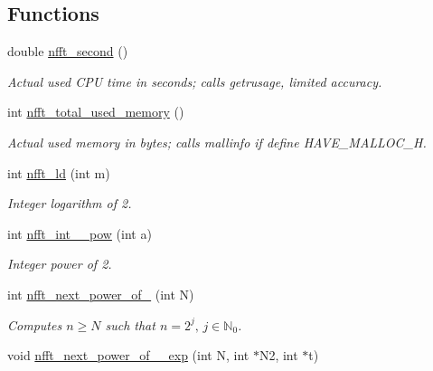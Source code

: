 \subsection*{Functions}
\begin{CompactItemize}
\item 
double \hyperlink{group__nfftutil_ga0}{nfft\_\-second} ()
\begin{CompactList}\small\item\em Actual used CPU time in seconds; calls getrusage, limited accuracy. \item\end{CompactList}\item 
\hypertarget{group__nfftutil_ga1}{
int \hyperlink{group__nfftutil_ga1}{nfft\_\-total\_\-used\_\-memory} ()}
\label{group__nfftutil_ga1}

\begin{CompactList}\small\item\em Actual used memory in bytes; calls mallinfo if define HAVE\_\-MALLOC\_\-H. \item\end{CompactList}\item 
\hypertarget{group__nfftutil_ga2}{
int \hyperlink{group__nfftutil_ga2}{nfft\_\-ld} (int m)}
\label{group__nfftutil_ga2}

\begin{CompactList}\small\item\em Integer logarithm of 2. \item\end{CompactList}\item 
\hypertarget{group__nfftutil_ga3}{
int \hyperlink{group__nfftutil_ga3}{nfft\_\-int\_\_\-pow} (int a)}
\label{group__nfftutil_ga3}

\begin{CompactList}\small\item\em Integer power of 2. \item\end{CompactList}\item 
\hypertarget{group__nfftutil_ga4}{
int \hyperlink{group__nfftutil_ga4}{nfft\_\-next\_\-power\_\-of\_} (int N)}
\label{group__nfftutil_ga4}

\begin{CompactList}\small\item\em Computes $n\ge N$ such that $n=2^j,\, j\in\mathbb{N}_0$. \item\end{CompactList}\item 
\hypertarget{group__nfftutil_ga5}{
void \hyperlink{group__nfftutil_ga5}{nfft\_\-next\_\-power\_\-of\_\_\-exp} (int N, int $\ast$N2, int $\ast$t)}
\label{group__nfftutil_ga5}


\end{CompactItemize}
